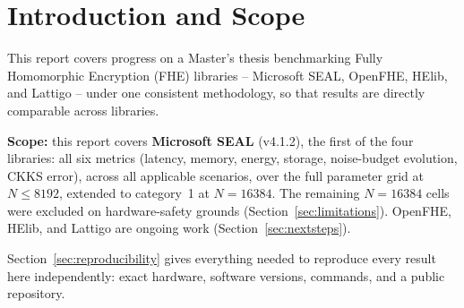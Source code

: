 \section{Introduction and Scope}
\label{sec:intro}

This report covers progress on a Master's thesis benchmarking Fully Homomorphic Encryption (FHE) libraries -- Microsoft SEAL, OpenFHE, HElib, and Lattigo -- under one consistent methodology, so that results are directly comparable across libraries.

\textbf{Scope:} this report covers \textbf{Microsoft SEAL} (v4.1.2), the first of the four libraries: all six metrics (latency, memory, energy, storage, noise-budget evolution, CKKS error), across all applicable scenarios, over the full parameter grid at $N \le 8192$, extended to category~1 at $N=16384$. The remaining $N=16384$ cells were excluded on hardware-safety grounds (Section~\ref{sec:limitations}). OpenFHE, HElib, and Lattigo are ongoing work (Section~\ref{sec:nextsteps}).

Section~\ref{sec:reproducibility} gives everything needed to reproduce every result here independently: exact hardware, software versions, commands, and a public repository.

